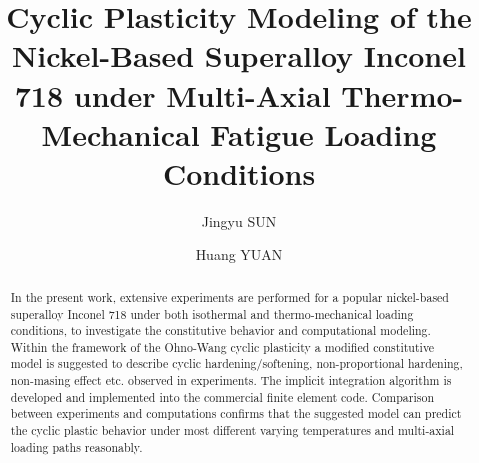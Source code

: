 \documentclass[preprint,5p,twocolumn,11pt,sort&compress]{elsarticle}
\begin{document}



\begin{frontmatter}



\title{Cyclic Plasticity Modeling of the Nickel-Based Superalloy Inconel 718 under Multi-Axial Thermo-Mechanical Fatigue Loading Conditions}


\author{Jingyu SUN}
\author{Huang YUAN}

\address[label1]{School of Aerospace Engineering, Tsinghua University, Beijing, China}

\begin{abstract}
In the present work, extensive experiments are performed for a popular nickel-based superalloy Inconel 718 under both isothermal and thermo-mechanical loading conditions, to investigate the constitutive behavior and computational modeling. Within the framework of the Ohno-Wang cyclic plasticity a modified constitutive model is suggested to describe cyclic hardening/softening, non-proportional hardening, non-masing effect etc. observed in experiments. The implicit integration algorithm is developed and implemented into the commercial finite element code. Comparison between experiments and computations confirms that the suggested model can predict the cyclic plastic behavior under most different varying temperatures and multi-axial loading paths reasonably. 
\end{abstract}


\end{frontmatter}
\end{document}
